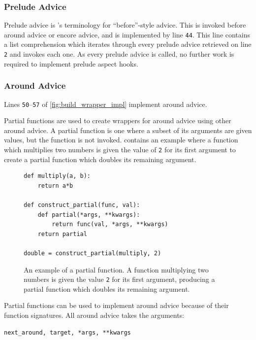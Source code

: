 \subsubsection{Prelude Advice}

Prelude advice is \pdsf{}'s terminology for ``before''-style advice. This is
invoked before around advice or encore advice, and is implemented by line
\texttt{44}. This line contains a list comprehension which iterates through
every prelude advice retrieved on line \texttt{2} and invokes each one. As every
prelude advice is called, no further work is required to implement prelude
aspect hooks.

\subsubsection{Around Advice}

Lines \texttt{50}--\texttt{57} of \cref{fig:build_wrapper_impl} implement around advice.

Partial functions are used to create wrappers for around advice using other
around advice. A partial function is one where a subset of its arguments are
given values, but the function is not invoked.
 contains an example where a function
which multiplies two numbers is given the value of \lstinline{2} for its first
argument to create a partial function which doubles its remaining argument.

\begin{figure}
\begin{lstlisting}[style=footnotesize_python]
def multiply(a, b):
    return a*b

def construct_partial(func, val):
    def partial(*args, **kwargs):
        return func(val, *args, **kwargs)
    return partial

double = construct_partial(multiply, 2)
\end{lstlisting}
\caption{An example of a partial function. A function multiplying two numbers is
given the value \lstinline{2} for its first argument, producing a partial
function which doubles its remaining argument.}
\label{fig:partial_function_explanation}
\end{figure}

Partial functions can be used to implement around advice because of their
function signatures. All around advice takes the arguments:

{\centering

\lstinline{next_around, target, *args, **kwargs}

}

